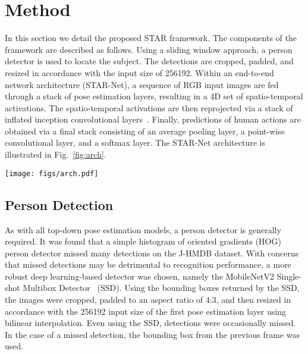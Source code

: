 \documentclass[10pt, conference, compsocconf]{IEEEtran}
\begin{document}
\section{Method}

In this section we detail the proposed STAR framework. The components of the framework are described as follows. Using a sliding window approach, a person detector is used to locate the subject. The detections are cropped, padded, and resized in accordance with the input size of 256192. Within an end-to-end network architecture (STAR-Net), a sequence of RGB input images are fed through a stack of pose estimation layers, resulting in a 4D set of spatio-temporal activations. The spatio-temporal activations are then reprojected via a stack of inflated inception convolutional layers~\cite{carreira2017quo}. Finally, predictions of human actions are obtained via a final stack consisting of an average pooling layer, a point-wise convolutional layer, and a softmax layer. The STAR-Net architecture is illustrated in Fig.~\ref{fig:arch}.

\begin{figure*}
    \centering
    \texttt{[image: figs/arch.pdf]}
    \vspace{-20pt}
    \caption{STAR-Net. Within an end-to-end network architecture, a sequence of RGB input images are fed through a stack of pose estimation layers, resulting in a 4D set of spatio-temporal activations. The spatio-temporal activations are then reprojected via a stack of inflated inception~\cite{carreira2017quo} convolutional layers.  Finally, predictions of human action are obtained via a final stack consisting of an average pooling layer, a point-wise convolutional layer, and a softmax layer.}
    \label{fig:arch}
\end{figure*}

\subsection{Person Detection}
As with all top-down pose estimation models, a person detector is generally required. It was found that a simple histogram of oriented gradients (HOG) person detector missed many detections on the J-HMDB dataset. With concerns that missed detections may be detrimental to recognition performance, a more robust deep learning-based detector was chosen, namely the MobileNetV2 Single-shot Multibox Detector~\cite{sandler2018mobilenetv2} (SSD). Using the bounding boxes returned by the SSD, the images were cropped, padded to an aspect ratio of 4:3, and then resized in accordance with the 256192 input size of the first pose estimation layer using bilinear interpolation. Even using the SSD, detections were occasionally missed. In the case of a missed detection, the bounding box from the previous frame was used. 
\end{document}
